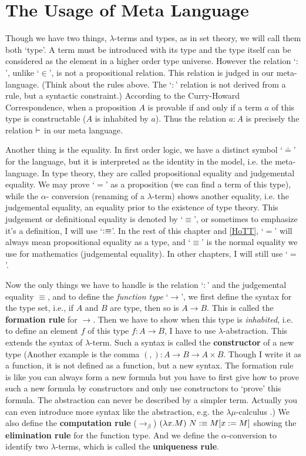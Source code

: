 \section{The Usage of Meta Language}
Though we have two things, $\lambda$-terms and types, as in set theory,
we will call them both `type'. A term must be introduced with its type 
and the type itself can be considered as the element in a higher order 
type universe. However the relation `$:$', unlike `$\in$', is not a 
propositional relation. This relation is judged in our meta-language. 
(Think about the rules above. The `$:$' relation is not derived from a 
rule, but a syntactic constraint.) According to the Curry-Howard 
Correspondence, when a proposition $A$ is provable if and only if a term 
$a$ of this type is constructable ($A$ is inhabited by $a$). Thus the 
relation $a:A$ is precisely the relation $\vdash$ in our meta language. 

Another thing is the equality. In first order logic, we have a distinct
symbol `$\doteq$' for the language, but it is interpreted as the identity
in the model, i.e. the meta-language. In type theory, they are called
propositional equality and judgemental equality. We may prove `$=$' as
a proposition (we can find a term of this type), while the $\alpha$-
conversion (renaming of a $\lambda$-term) shows another equality, i.e.
the judgemental equality, an equality prior to the existence of type
theory. This judgement or definitional equality is denoted by `$\equiv$',
or sometimes to emphasize it's a definition, I will use `$:\equiv$'. In 
the rest of this chapter and \autoref{HoTT}, `$=$' will always mean
propositional equality as a type, and `$\equiv$' is the normal equality
we use for mathematics (judgemental equality). In other chapters, I will 
still use `$=$'. 

Now the only things we have to handle is the relation `$:$' and the 
judgemental equality $\equiv$, and to define the {\it function type} 
`$\to$', we first define the syntax for the type set, i.e., if $A$ and 
$B$ are type, then so is $A\to B$. This is called the {\bf formation 
rule} for $\to$. Then we have to show when this type is {\it inhabited}, 
i.e. to define an element $f$ of this type $f:A\to B$, I have to use 
$\lambda$-abstraction. This extends the syntax of $\lambda$-term. 
Such a syntax is called the {\bf constructor} of a new type 
(Another example is the comma $(,): A\to B\to A\times B$. Though I write 
it as a function, it is not defined as a function, but a new syntax. 
The formation rule is like you can always form a new formula but you
have to first give how to prove such a new formula by constructors and
only use constructors to `prove' this formula. The abstraction can never 
be described by a simpler term. Actually you can even introduce more 
syntax like the abstraction, e.g. the $\lambda\mu$-calculus 
\cite{lambda-mu-calculus}.) We also define the {\bf computation rule}
($\to_\beta$) $(\lambda x. M)\ N :\equiv M[x:=M]$ showing the 
{\bf elimination rule} for the function type. And we define the 
$\alpha$-conversion to identify two $\lambda$-terms, which is called 
the {\bf uniqueness rule}.

